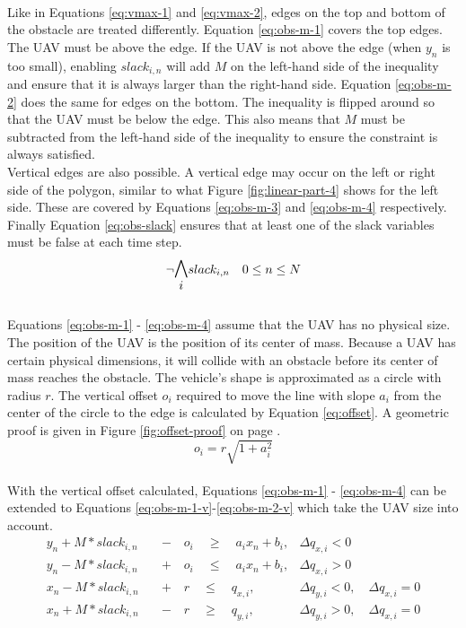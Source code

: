 \\
Like in Equations \ref{eq:vmax-1} and \ref{eq:vmax-2}, edges on the top and bottom of the obstacle are treated differently. Equation \ref{eq:obs-m-1} covers the top edges. The UAV must be above the edge. If the UAV is not above the edge (when $y_n$ is too small), enabling $slack_{i,n}$ will add $M$ on the left-hand side of the inequality and ensure that it is always larger than the right-hand side. Equation \ref{eq:obs-m-2} does the same for edges on the bottom. The inequality is flipped around so that the UAV must be below the edge. This also means that $M$ must be subtracted from the left-hand side of the inequality to ensure the constraint is always satisfied. \\
Vertical edges are also possible. A vertical edge may occur on the left or right side of the polygon, similar to what Figure \ref{fig:linear-part-4} shows for the left side. These are covered by Equations \ref{eq:obs-m-3} and \ref{eq:obs-m-4} respectively.\\
Finally Equation \ref{eq:obs-slack} ensures that at least one of the slack variables must be false at each time step.
\\
\begin{equation}
\neg \mathlarger{\mathlarger{\bigwedge_{i}}} slack_{i,n} \quad 0 \leq n \leq N
\label{eq:obs-slack}
\end{equation}
\\
Equations \ref{eq:obs-m-1} - \ref{eq:obs-m-4} assume that the UAV has no physical size. The position of the UAV is the position of its center of mass. Because a UAV has certain physical dimensions, it will collide with an obstacle before its center of mass reaches the obstacle. The vehicle's shape is approximated as a circle with radius $r$. The vertical offset $o_i$ required to move the line with slope $a_i$ from the center of the circle to the edge is calculated by Equation \ref{eq:offset}. A geometric proof is given in Figure \ref{fig:offset-proof} on page \pageref{fig:offset-proof}.
\\
\begin{equation}
o_{i} = r \sqrt{1 + a_i^2}
\label{eq:offset}
\end{equation}
\\
With the vertical offset calculated, Equations \ref{eq:obs-m-1} - \ref{eq:obs-m-4} can be extended to Equations \ref{eq:obs-m-1-v}-\ref{eq:obs-m-2-v} which take the UAV size into account.
\\
\begin{align}
y_{n} + M*slack_{i,n} \quad &- \quad o_i \quad \geq 
\quad a_{i} x_{n} + b_{i},  	
& \Delta q_{x,i} < 0 							 	
\label{eq:obs-m-1-v} \\
y_{n} - M*slack_{i,n} \quad &+ \quad o_i \quad \leq 
\quad a_{i} x_{n} + b_{i},
& \Delta q_{x,i} > 0 							 	
\label{eq:obs-m-2-v} \\
x_{n} - M*slack_{i,n} \quad &+ \quad r \quad \leq
\quad  q_{x,i}, 		
& \Delta q_{y,i} < 0, \quad \Delta q_{x,i} = 0 	
\label{eq:obs-m-3-v} \\
x_{n} + M*slack_{i,n} \quad &- \quad r \quad \geq 
\quad q_{y,i},  		
& \Delta q_{y,i} > 0, \quad \Delta q_{x,i} = 0 	
\label{eq:obs-m-4-v}
\end{align}


